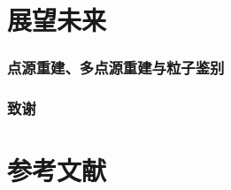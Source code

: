 \documentclass[aspectratio=169]{beamer}
\begin{document}
\section{展望未来}
\begin{frame}
    \frametitle{点源重建、多点源重建与粒子鉴别}



\end{frame}

\begin{frame}
    \frametitle{致谢}



\end{frame}
\section{参考文献}
\end{document}
